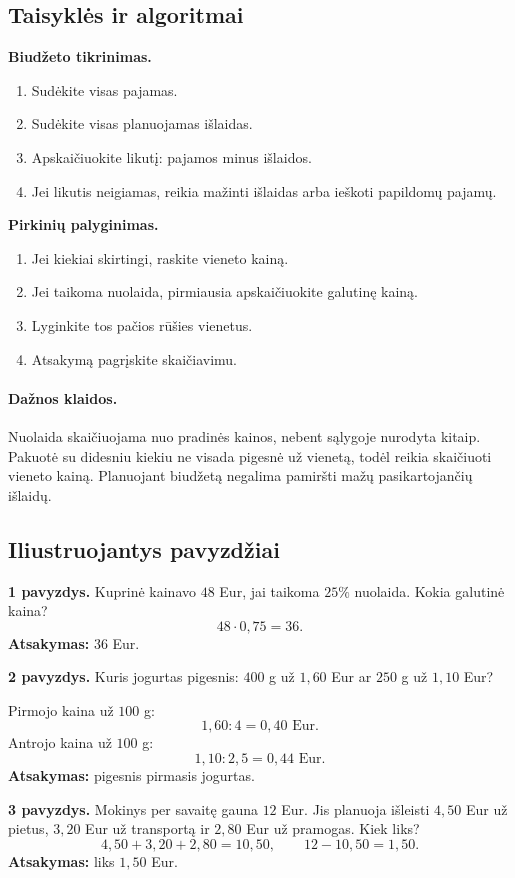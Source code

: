 \subsection{Taisyklės ir algoritmai}
\textbf{Biudžeto tikrinimas.}
\begin{enumerate}[label=\arabic*.]
\item Sudėkite visas pajamas.
\item Sudėkite visas planuojamas išlaidas.
\item Apskaičiuokite likutį: pajamos minus išlaidos.
\item Jei likutis neigiamas, reikia mažinti išlaidas arba ieškoti papildomų pajamų.
\end{enumerate}

\textbf{Pirkinių palyginimas.}
\begin{enumerate}[label=\arabic*.]
\item Jei kiekiai skirtingi, raskite vieneto kainą.
\item Jei taikoma nuolaida, pirmiausia apskaičiuokite galutinę kainą.
\item Lyginkite tos pačios rūšies vienetus.
\item Atsakymą pagrįskite skaičiavimu.
\end{enumerate}

\paragraph{Dažnos klaidos.}
Nuolaida skaičiuojama nuo pradinės kainos, nebent sąlygoje nurodyta kitaip. Pakuotė su didesniu kiekiu ne visada pigesnė už vienetą, todėl reikia skaičiuoti vieneto kainą. Planuojant biudžetą negalima pamiršti mažų pasikartojančių išlaidų.

\subsection{Iliustruojantys pavyzdžiai}
\textbf{1 pavyzdys.} Kuprinė kainavo \(48\) Eur, jai taikoma \(25\%\) nuolaida. Kokia galutinė kaina?
\[
48\cdot 0,75=36.
\]
\textbf{Atsakymas:} \(36\) Eur.

\textbf{2 pavyzdys.} Kuris jogurtas pigesnis: \(400\) g už \(1,60\) Eur ar \(250\) g už \(1,10\) Eur?

Pirmojo kaina už \(100\) g:
\[
1,60:4=0,40\text{ Eur}.
\]
Antrojo kaina už \(100\) g:
\[
1,10:2,5=0,44\text{ Eur}.
\]
\textbf{Atsakymas:} pigesnis pirmasis jogurtas.

\textbf{3 pavyzdys.} Mokinys per savaitę gauna \(12\) Eur. Jis planuoja išleisti \(4,50\) Eur už pietus, \(3,20\) Eur už transportą ir \(2,80\) Eur už pramogas. Kiek liks?
\[
4,50+3,20+2,80=10,50,\qquad 12-10,50=1,50.
\]
\textbf{Atsakymas:} liks \(1,50\) Eur.

